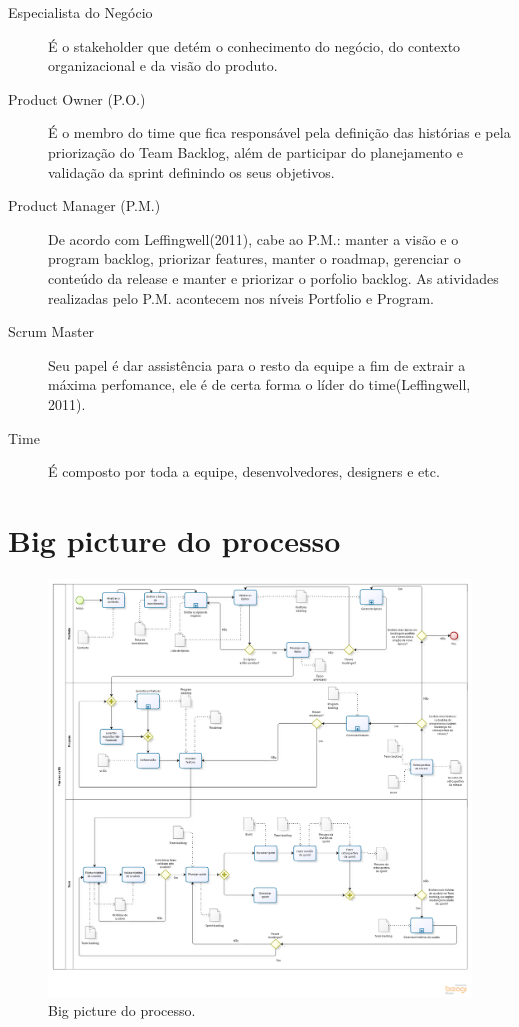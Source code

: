 \begin{description}
\item[Especialista do Negócio] É o stakeholder que detém o conhecimento do negócio, do contexto organizacional e da visão do produto.    
\item[Product Owner (P.O.)] É o membro do time que fica responsável pela definição das histórias e pela priorização do Team Backlog, além de participar do planejamento e validação da sprint definindo os seus objetivos.
\item[Product Manager (P.M.)] De acordo com Leffingwell(2011), cabe ao P.M.: manter a visão e o program backlog, priorizar features, manter o roadmap, gerenciar o conteúdo da release e manter e priorizar o porfolio backlog. As atividades realizadas pelo P.M. acontecem nos níveis Portfolio e Program.
\item[Scrum Master] Seu papel é dar assistência para o resto da equipe a fim de extrair a máxima perfomance, ele é de certa forma o líder do time(Leffingwell, 2011).
\item[Time] É composto por toda a equipe, desenvolvedores, designers e etc.
\end{description}

\section{Big picture do processo}
  \begin{figure}[!htbp]
    \centering
    \includegraphics[scale=0.3]{figuras/Processo_v1-2}
    \caption[Big picture do processo.]{Big picture do processo. \footnotemark}
    \label{processo}
  \end{figure}
